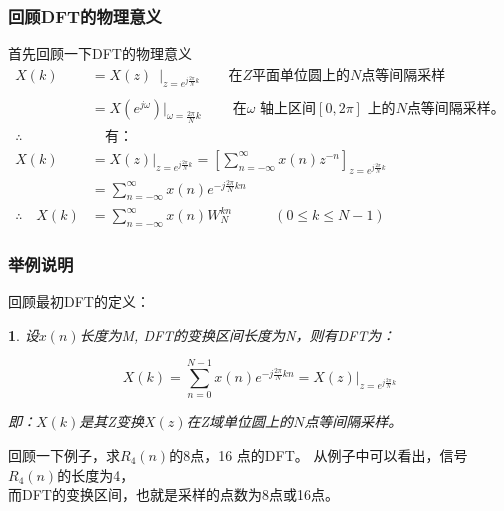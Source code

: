\documentclass[notheorems,compress,mathserif,table]{beamer}
\newtheorem{dablock}{}
\begin{document}
\begin{frame}[shrink]\frametitle{回顾DFT的物理意义}%

首先回顾一下DFT的物理意义
\begin{equation*}
\begin{split}
X(k)  &= X(z)\;\:\Big|_{z = e^{j\frac{2\pi}{N}k}}  \qquad \mbox{在$Z$平面单位圆上的$N$点等间隔采样}\\
 \quad&\quad\\
      &= X(e^{j\omega})\Big|_{\omega = \frac{2\pi}{N}k} \qquad\: \mbox{在$\omega$ 轴上区间$[0,2\pi]$ 上的$N$点等间隔采样。}\\
\therefore\quad  &\quad\mbox{有：}   \\
X(k) &= X(z)\Big|_{z = e^{j\frac{2\pi}{N}k}} = \left[\sum_{n=-\infty}^{\infty}x(n)z^{-n}\right]_{z = e^{j\frac{2\pi}{N}k}}\\
     &= \sum_{n=-\infty}^{\infty}x(n)e^{-j\frac{2\pi}{N}kn} \\
\therefore\quad X(k) &= \sum_{n=-\infty}^{\infty}x(n)W_N^{kn} \qquad\quad (0 \leq k \leq N-1)
\end{split}
\end{equation*}
\end{frame}




\begin{frame}[shrink]\frametitle{举例说明}%
回顾最初DFT的定义：
\begin{dablock}
	设$ x(n) $长度为M, DFT的变换区间长度为N，则有DFT为：
	
	$$ X(k) = \sum_{n=0}^{N-1}x(n)e^{-j\frac{2\pi}{N}kn} = X(z)\Big|_{z = e^{j\frac{2\pi}{N}k}}$$
	

即：$X(k)$是其Z变换$X(z)$在Z域单位圆上的$N$点等间隔采样。
\end{dablock}
回顾一下例子，求$R_4(n)$的8点，16 点的DFT。
\newline\newline
从例子中可以看出，信号$R_4(n)$的长度为4，\\
而DFT的变换区间，也就是采样的点数为8点或16点。
\newline\newline
\end{frame}
\end{document}
